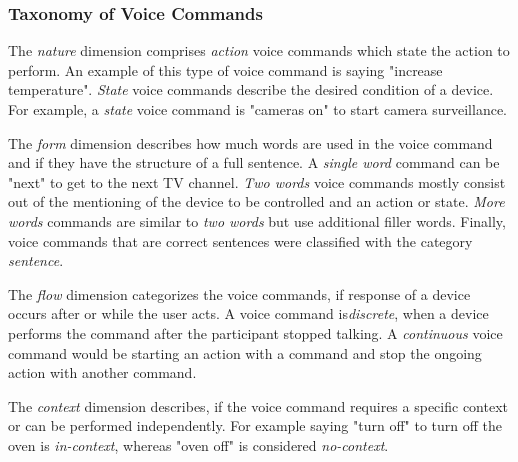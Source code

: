 \documentclass[sigchi]{acmart}
\begin{document}
	\subsubsection{Taxonomy of Voice Commands}
	The \textit{nature} dimension comprises \textit{action} voice commands which state the action to perform. An example of this type of voice command is saying "increase temperature". \textit{State} voice commands describe the desired condition of a device. For example, a \textit{state} voice command is "cameras on" to start camera surveillance.
	
	The \textit{form} dimension describes how much words are used in the voice command and if they have the structure of a full sentence. A \textit{single word} command can be "next" to get to the next TV channel. \textit{Two words} voice commands mostly consist out of the mentioning of the device to be controlled and an action or state. \textit{More words} commands are similar to \textit{two words} but use additional filler words. Finally, voice commands that are correct sentences were classified with the category \textit{sentence}.
	
	The \textit{flow} dimension categorizes the voice commands, if response of a device occurs after or while the user acts. A voice command is\textit{discrete}, when a device performs the command after the participant stopped talking. A \textit{continuous} voice command would be starting an action with a command and stop the ongoing action with another command.
	
	The \textit{context} dimension describes, if the voice command requires a specific context or can be performed independently. For example saying "turn off" to turn off the oven is \textit{in-context}, whereas "oven off" is considered \textit{no-context}.
	
\end{document}
